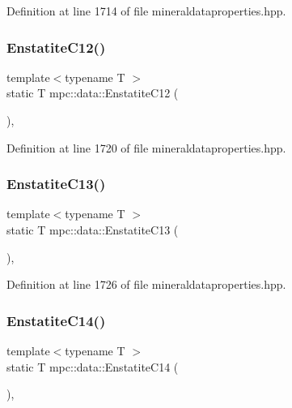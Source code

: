 Definition at line 1714 of file mineraldataproperties.\+hpp.

\mbox{\label{namespacempc_1_1data_aa2bbd4adf8938196d9e13efd07c02311}} 
\subsubsection{\texorpdfstring{Enstatite\+C12()}{EnstatiteC12()}}
{\footnotesize\ttfamily template$<$typename T $>$ \\
static T mpc\+::data\+::\+Enstatite\+C12 (\begin{DoxyParamCaption}{ }\end{DoxyParamCaption})\hspace{0.3cm}{\ttfamily [inline]}, {\ttfamily [static]}}



Definition at line 1720 of file mineraldataproperties.\+hpp.

\mbox{\label{namespacempc_1_1data_ae78c4d555604d2fdb2502bb2855142ef}} 
\subsubsection{\texorpdfstring{Enstatite\+C13()}{EnstatiteC13()}}
{\footnotesize\ttfamily template$<$typename T $>$ \\
static T mpc\+::data\+::\+Enstatite\+C13 (\begin{DoxyParamCaption}{ }\end{DoxyParamCaption})\hspace{0.3cm}{\ttfamily [inline]}, {\ttfamily [static]}}



Definition at line 1726 of file mineraldataproperties.\+hpp.

\mbox{\label{namespacempc_1_1data_af5c0211ec6b7111009cb7773bdee3c04}} 
\subsubsection{\texorpdfstring{Enstatite\+C14()}{EnstatiteC14()}}
{\footnotesize\ttfamily template$<$typename T $>$ \\
static T mpc\+::data\+::\+Enstatite\+C14 (\begin{DoxyParamCaption}{ }\end{DoxyParamCaption})\hspace{0.3cm}{\ttfamily [inline]}, {\ttfamily [static]}}



